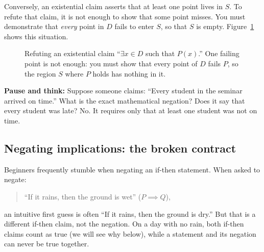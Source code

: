 Conversely, an existential claim asserts that at least one point lives in $S$. To refute that claim, it is not enough to show that some point misses. You must demonstrate that \emph{every} point in $D$ fails to enter $S$, so that $S$ is empty. Figure~\ref{05:fig-existential-negation} shows this situation.

\begin{figure}[htbp]
\centering
{}
\caption{Refuting an existential claim ``$\exists x \in D$ such that $P(x)$.'' One failing point is not enough: you must show that every point of $D$ fails $P$, so the region $S$ where $P$ holds has nothing in it.}
\label{05:fig-existential-negation}
\end{figure}

\begin{recoverybox}
\textbf{Pause and think:} Suppose someone claims: ``Every student in the seminar arrived on time.'' What is the exact mathematical negation? Does it say that every student was late? No. It requires only that at least one student was not on time.
\end{recoverybox}

\subsection{Negating implications: the broken contract}

Beginners frequently stumble when negating an if-then statement. When asked to negate:
\begin{quote}
``If it rains, then the ground is wet'' ($P \implies Q$),
\end{quote}
an intuitive first guess is often ``If it rains, then the ground is dry.'' But that is a different if-then claim, not the negation. On a day with no rain, both if-then claims count as true (we will see why below), while a statement and its negation can never be true together.

